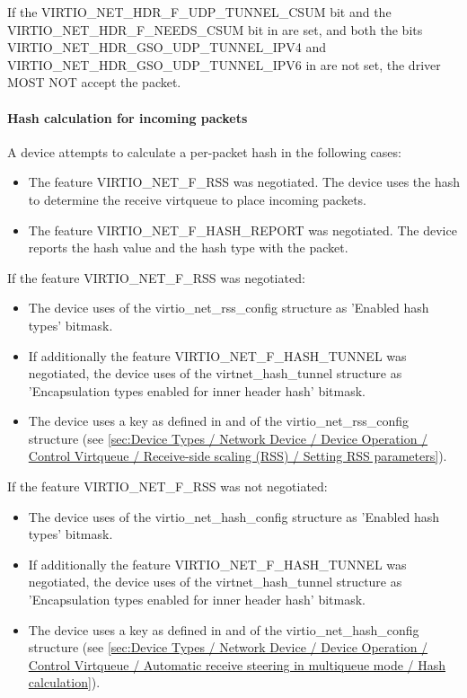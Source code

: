 If the VIRTIO_NET_HDR_F_UDP_TUNNEL_CSUM bit and the VIRTIO_NET_HDR_F_NEEDS_CSUM
bit in  are set,
and both the bits VIRTIO_NET_HDR_GSO_UDP_TUNNEL_IPV4 and
VIRTIO_NET_HDR_GSO_UDP_TUNNEL_IPV6 in  are not set,
the driver MOST NOT accept the packet.

\paragraph{Hash calculation for incoming packets}
\label{sec:Device Types / Network Device / Device Operation / Processing of Incoming Packets / Hash calculation for incoming packets}

A device attempts to calculate a per-packet hash in the following cases:
\begin{itemize}
\item The feature VIRTIO_NET_F_RSS was negotiated. The device uses the hash to determine the receive virtqueue to place incoming packets.
\item The feature VIRTIO_NET_F_HASH_REPORT was negotiated. The device reports the hash value and the hash type with the packet.
\end{itemize}

If the feature VIRTIO_NET_F_RSS was negotiated:
\begin{itemize}
\item The device uses  of the virtio_net_rss_config structure as 'Enabled hash types' bitmask.
\item If additionally the feature VIRTIO_NET_F_HASH_TUNNEL was negotiated, the device uses  of the
      virtnet_hash_tunnel structure as 'Encapsulation types enabled for inner header hash' bitmask.
\item The device uses a key as defined in  and  of the virtio_net_rss_config structure (see
\ref{sec:Device Types / Network Device / Device Operation / Control Virtqueue / Receive-side scaling (RSS) / Setting RSS parameters}).
\end{itemize}

If the feature VIRTIO_NET_F_RSS was not negotiated:
\begin{itemize}
\item The device uses  of the virtio_net_hash_config structure as 'Enabled hash types' bitmask.
\item If additionally the feature VIRTIO_NET_F_HASH_TUNNEL was negotiated, the device uses  of the
      virtnet_hash_tunnel structure as 'Encapsulation types enabled for inner header hash' bitmask.
\item The device uses a key as defined in  and  of the virtio_net_hash_config structure (see
\ref{sec:Device Types / Network Device / Device Operation / Control Virtqueue / Automatic receive steering in multiqueue mode / Hash calculation}).
\end{itemize}

